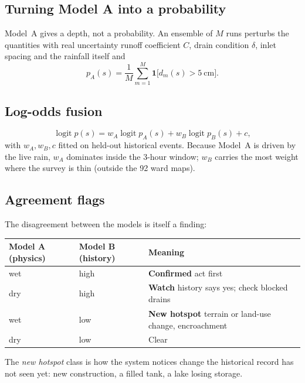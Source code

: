 \documentclass[11pt,a4paper]{article}
\begin{document}
\subsection{Turning Model A into a probability}
Model~A gives a depth, not a probability. An ensemble of $M$ runs perturbs the
quantities with real uncertainty \textendash{} runoff coefficient $C$, drain condition
$\delta$, inlet spacing and the rainfall itself \textendash{} and
\begin{equation}
  p_A(s) = \frac{1}{M}\sum_{m=1}^{M} \mathbf{1}\big[d_m(s) > 5\ \text{cm}\big].
\end{equation}

\subsection{Log-odds fusion}
\begin{equation}
  \operatorname{logit} p(s) = w_A \operatorname{logit} p_A(s)
                            + w_B \operatorname{logit} p_B(s) + c,
\end{equation}
with $w_A, w_B, c$ fitted on held-out historical events. Because Model~A is driven by
the live rain, $w_A$ dominates inside the 3-hour window; $w_B$ carries the most weight
where the survey is thin (outside the 92 ward maps).

\subsection{Agreement flags}
The disagreement between the models is itself a finding:
\begin{center}
\begin{tabular}{@{}lll@{}}
\toprule
Model A (physics) & Model B (history) & Meaning\\
\midrule
wet & high & \textbf{Confirmed} \textendash{} act first\\
dry & high & \textbf{Watch} \textendash{} history says yes; check blocked drains\\
wet & low & \textbf{New hotspot} \textendash{} terrain or land-use change, encroachment\\
dry & low & Clear\\
\bottomrule
\end{tabular}
\end{center}
The \emph{new hotspot} class is how the system notices change the historical record
has not seen yet: new construction, a filled tank, a lake losing storage.

\end{document}
